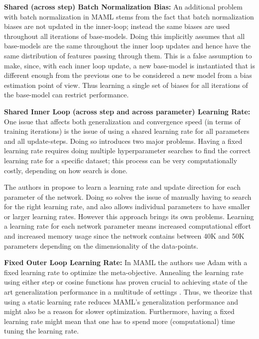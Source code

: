 \documentclass{article} \usepackage[dvipsnames]{xcolor}
\begin{document}
\textbf{Shared (across step) Batch Normalization Bias:} An additional problem with batch normalization in MAML stems from the fact that batch normalization biases are not updated in the inner-loop; instead the same biases are used throughout all iterations of base-models. Doing this implicitly assumes that all base-models are the same throughout the inner loop updates and hence have the same distribution of features passing through them. This is a false assumption to make, since, with each inner loop update, a new base-model is instantiated that is different enough from the previous one to be considered a new model from a bias estimation point of view. Thus learning a single set of biases for all iterations of the base-model can restrict performance.

\textbf{Shared Inner Loop (across step and across parameter) Learning Rate:} One issue that affects both generalization and convergence speed (in terms of training iterations) is the issue of using a shared learning rate for all parameters and all update-steps. Doing so introduces two major problems. Having a fixed learning rate requires doing multiple hyperparameter searches to find the correct learning rate for a specific dataset; this process can be very computationally costly, depending on how search is done. 



The authors in \citep{li2017meta} propose to learn a learning rate and update direction for each parameter of the network. Doing so solves the issue of manually having to search for the right learning rate, and also allows individual parameters to have smaller or larger learning rates. However this approach brings its own problems. Learning a learning rate for each network parameter means increased computational effort and increased memory usage since the network contains between 40K and 50K parameters depending on the dimensionality of the data-points. 



\textbf{Fixed Outer Loop Learning Rate:} In MAML the authors use Adam with a fixed learning rate to optimize the meta-objective. Annealing the learning rate using either step or cosine functions has proven crucial to achieving state of the art generalization performance in a multitude of settings \citep{loshchilov2016sgdr,he2016deep,larsson2016fractalnet,huang2017densely}. Thus, we theorize that using a static learning rate reduces MAML's generalization performance and might also be a reason for slower optimization. Furthermore, having a fixed learning rate might mean that one has to spend more (computational) time tuning the learning rate.
\end{document}
